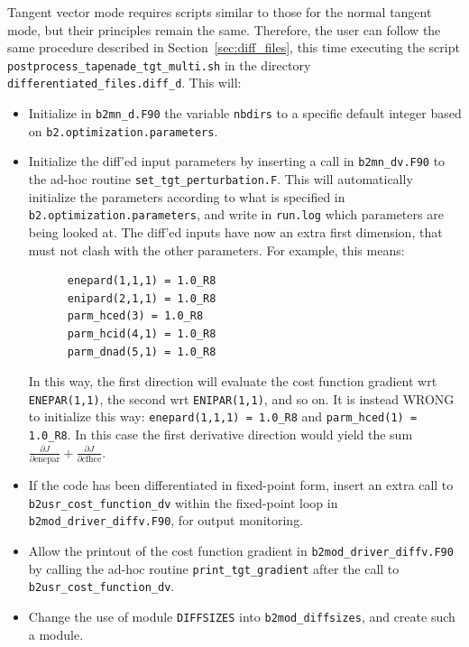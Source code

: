 \begin{sloppypar}
Tangent vector mode requires scripts similar to those for the normal tangent mode, but their principles remain the same. Therefore, the user can follow the same procedure described in Section~\ref{sec:diff_files}, this time executing the script {\tt postprocess\_tapenade\_tgt\_multi.sh} in the directory {\tt differentiated\_files.diff\_d}. This will:
\begin{itemize}
  \item Initialize in {\tt b2mn\_d.F90} the variable {\tt nbdirs} to a specific default integer based on {\tt b2.optimization.parameters}.

  \item Initialize the diff'ed input parameters by inserting a call in {\tt b2mn\_dv.F90} to the ad-hoc routine {\tt set\_tgt\_perturbation.F}. This will automatically initialize the parameters according to what is specified in {\tt b2.optimization.parameters}, and write in {\tt run.log} which parameters are being looked at. The diff'ed inputs have now an extra first dimension, that must not clash with the other parameters. For example, this means:
    \begin{verbatim}
      enepard(1,1,1) = 1.0_R8
      enipard(2,1,1) = 1.0_R8
      parm_hced(3) = 1.0_R8
      parm_hcid(4,1) = 1.0_R8
      parm_dnad(5,1) = 1.0_R8
    \end{verbatim}
    In this way, the first direction will evaluate the cost function gradient wrt {\tt ENEPAR(1,1)}, the second wrt {\tt ENIPAR(1,1)}, and so on. It is instead WRONG to initialize this way: {\tt enepard(1,1,1) = 1.0\_R8} and {\tt parm\_hced(1) = 1.0\_R8}. In this case the first derivative direction would yield the sum $\frac{\partial J}{\partial \mathrm{enepar}} + \frac{\partial J}{\partial \mathrm{cfhce}}$.

  \item If the code has been differentiated in fixed-point form, insert an extra call to {\tt b2usr\_cost\_function\_dv} within the fixed-point loop in {\tt b2mod\_driver\_diffv.F90}, for output monitoring.

  \item Allow the printout of the cost function gradient in {\tt b2mod\_driver\_diffv.F90} by calling the ad-hoc routine {\tt print\_tgt\_gradient} after the call to {\tt b2usr\_cost\_function\_dv}.

  \item Change the use of module {\tt DIFFSIZES} into {\tt b2mod\_diffsizes}, and create such a module.
\end{itemize}
\end{sloppypar}

